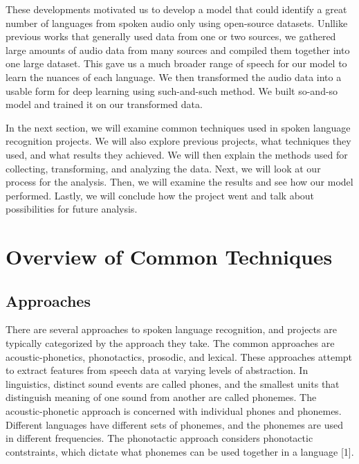 \documentclass{llncs}
\begin{document}
These developments motivated us to develop a model that could identify a great number of languages from spoken audio only using open-source datasets. Unllike previous works that generally used data from one or two sources, we gathered large amounts of audio data from many sources and compiled them together into one large dataset. This gave us a much broader range of speech for our model to learn the nuances of each language. We then transformed the audio data into a usable form for deep learning using such-and-such method. We built so-and-so model and trained it on our transformed data.

In the next section, we will examine common techniques used in spoken language recognition projects. We will also explore previous projects, what techniques they used, and what results they achieved. We will then explain the methods used for collecting, transforming, and analyzing the data. Next, we will look at our process for the analysis. Then, we will examine the results and see how our model performed. Lastly, we will conclude how the project went and talk about possibilities for future analysis.

\section{Overview of Common Techniques}
\subsection{Approaches}
There are several approaches to spoken language recognition, and projects are typically categorized by the approach they take. The common approaches are acoustic-phonetics, phonotactics, prosodic, and lexical. These approaches attempt to extract features from speech data at varying levels of abstraction. In linguistics, distinct sound events are called phones, and the smallest units that distinguish meaning of one sound from another are called phonemes. The acoustic-phonetic approach is concerned with individual phones and phonemes. Different languages have different sets of phonemes, and the phonemes are used in different frequencies. The phonotactic approach considers phonotactic contstraints, which dictate what phonemes can be used together in a language [1].
\end{document}
